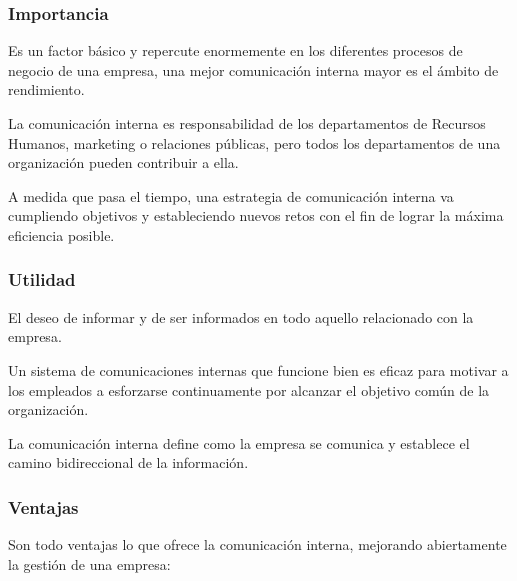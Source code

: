 \subsubsection{Importancia}
Es un factor básico y repercute enormemente en los diferentes procesos de negocio de una empresa, una mejor comunicación interna mayor es el ámbito de rendimiento.

La comunicación interna es responsabilidad de los departamentos de Recursos Humanos, marketing o relaciones públicas, pero todos los departamentos de una organización pueden contribuir a ella.

A medida que pasa el tiempo, una estrategia de comunicación interna va cumpliendo objetivos y estableciendo nuevos retos con el fin de lograr la máxima eficiencia posible.

\subsubsection{Utilidad}
El deseo de informar y de ser informados en todo aquello relacionado con la empresa.

Un sistema de comunicaciones internas que funcione bien es eficaz para motivar a los empleados a esforzarse continuamente por alcanzar el objetivo común de la organización.

La comunicación interna define como la empresa se comunica y establece el camino bidireccional de la información. 

\subsubsection{Ventajas}
Son todo ventajas lo que ofrece la comunicación interna, mejorando abiertamente la gestión de una empresa:

